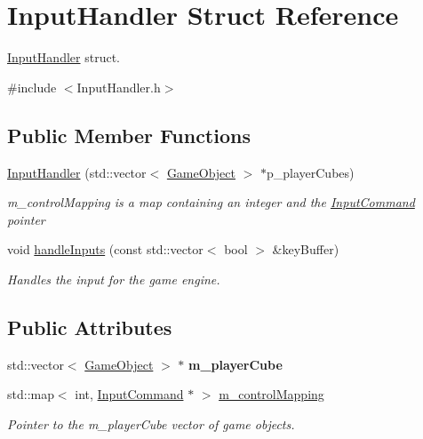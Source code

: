 \hypertarget{struct_input_handler}{}\section{Input\+Handler Struct Reference}
\label{struct_input_handler}


\mbox{\hyperlink{struct_input_handler}{Input\+Handler}} struct.  




{\ttfamily \#include $<$Input\+Handler.\+h$>$}

\subsection*{Public Member Functions}
\begin{DoxyCompactItemize}
\item 
\mbox{\hyperlink{struct_input_handler_aba97e51610d5809dadb917a43057e921}{Input\+Handler}} (std\+::vector$<$ \mbox{\hyperlink{class_game_object}{Game\+Object}} $>$ $\ast$p\+\_\+player\+Cubes)
\begin{DoxyCompactList}\small\item\em m\+\_\+control\+Mapping is a map containing an integer and the \mbox{\hyperlink{class_input_command}{Input\+Command}} pointer \end{DoxyCompactList}\item 
\mbox{\label{struct_input_handler_a250b665d3a9bc35bd8d6b544266e4faf}} 
void \mbox{\hyperlink{struct_input_handler_a250b665d3a9bc35bd8d6b544266e4faf}{handle\+Inputs}} (const std\+::vector$<$ bool $>$ \&key\+Buffer)
\begin{DoxyCompactList}\small\item\em Handles the input for the game engine. \end{DoxyCompactList}\end{DoxyCompactItemize}
\subsection*{Public Attributes}
\begin{DoxyCompactItemize}
\item 
\mbox{\label{struct_input_handler_aa83cb42d294f01fcfc9e0dc78fb43816}} 
std\+::vector$<$ \mbox{\hyperlink{class_game_object}{Game\+Object}} $>$ $\ast$ {\bfseries m\+\_\+player\+Cube}
\item 
\mbox{\label{struct_input_handler_abe853597d11b94e0668c8db6638a0548}} 
std\+::map$<$ int, \mbox{\hyperlink{class_input_command}{Input\+Command}} $\ast$ $>$ \mbox{\hyperlink{struct_input_handler_abe853597d11b94e0668c8db6638a0548}{m\+\_\+control\+Mapping}}
\begin{DoxyCompactList}\small\item\em Pointer to the m\+\_\+player\+Cube vector of game objects. \end{DoxyCompactList}\end{DoxyCompactItemize}


